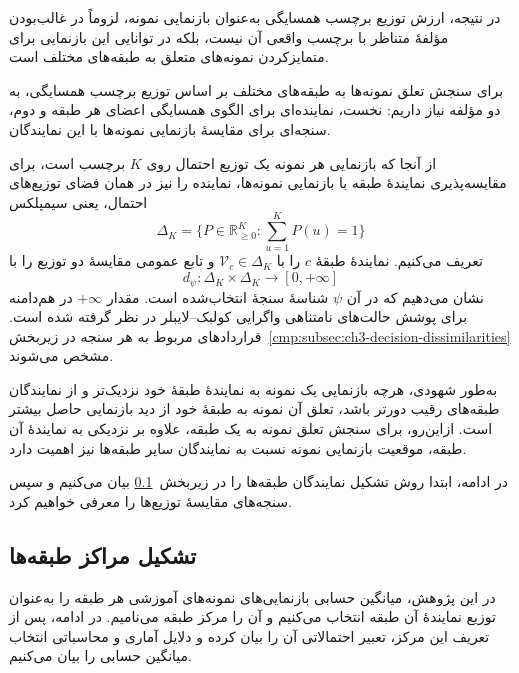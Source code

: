 در نتیجه، ارزش توزیع برچسب همسایگی به‌عنوان بازنمایی نمونه،
لزوماً در غالب‌بودن مؤلفهٔ متناظر با برچسب واقعی آن نیست،
بلکه در توانایی این بازنمایی برای متمایزکردن نمونه‌های متعلق
به طبقه‌های مختلف است.

برای سنجش تعلق نمونه‌ها به طبقه‌های مختلف بر اساس توزیع
برچسب همسایگی، به دو مؤلفه نیاز داریم: نخست، نماینده‌ای
برای الگوی همسایگی اعضای هر طبقه و دوم، سنجه‌ای برای
مقایسهٔ بازنمایی نمونه‌ها با این نمایندگان.

از آنجا که بازنمایی هر نمونه یک توزیع احتمال روی $K$ برچسب
است، برای مقایسه‌پذیری نمایندهٔ طبقه با بازنمایی نمونه‌ها،
نماینده را نیز در همان فضای توزیع‌های احتمال، یعنی سیمپلکس
\[
\Delta_K=\{P\in\mathbb R_{\ge0}^{K}:\sum_{u=1}^{K}P(u)=1\}
\]
تعریف می‌کنیم. نمایندهٔ طبقهٔ $c$ را با $\mathcal V_c\in\Delta_K$
و تابع عمومی مقایسهٔ دو توزیع را با
\[
d_\psi:\Delta_K\times\Delta_K\to[0,+\infty]
\]
نشان می‌دهیم که در آن $\psi$ شناسهٔ سنجهٔ انتخاب‌شده است.
مقدار $+\infty$ در هم‌دامنه برای پوشش حالت‌های
نامتناهی واگرایی کولبک--لایبلر در نظر گرفته شده است.
قراردادهای مربوط به هر سنجه در
زیربخش~\ref{cmp:subsec:ch3-decision-dissimilarities} مشخص می‌شوند.

به‌طور شهودی، هرچه بازنمایی یک نمونه به نمایندهٔ طبقهٔ خود
نزدیک‌تر و از نمایندگان طبقه‌های رقیب دورتر باشد، تعلق آن
نمونه به طبقهٔ خود از دید بازنمایی حاصل بیشتر است.
ازاین‌رو، برای سنجش تعلق نمونه به یک طبقه، علاوه بر نزدیکی
به نمایندهٔ آن طبقه، موقعیت بازنمایی نمونه نسبت به
نمایندگان سایر طبقه‌ها نیز اهمیت دارد.

در ادامه، ابتدا روش تشکیل نمایندگان طبقه‌ها را در
زیربخش~\ref{cmp:subsec:ch3-class-centers} بیان می‌کنیم
و سپس سنجه‌های مقایسهٔ توزیع‌ها را معرفی خواهیم کرد.

\subsection{تشکیل مراکز طبقه‌ها}
\label{cmp:subsec:ch3-class-centers}
\label{cmp:subsec:ch3-mean-center-justification}
در این پژوهش، میانگین حسابی بازنمایی‌های نمونه‌های آموزشی هر طبقه را
به‌عنوان توزیع نمایندهٔ آن طبقه انتخاب می‌کنیم و آن را مرکز طبقه می‌نامیم.
در ادامه، پس از تعریف این مرکز، تعبیر احتمالاتی آن را بیان کرده و
دلایل آماری و محاسباتی انتخاب میانگین حسابی را بیان می‌کنیم.

